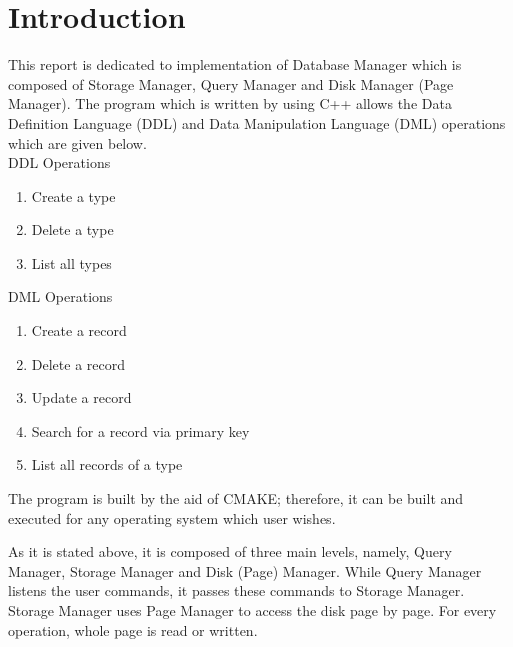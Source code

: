 \documentclass[12pt]{article}
\begin{document}
\begin{titlepage}

 


\end{titlepage}

\section{Introduction}

This report is dedicated to implementation of Database Manager which is composed of Storage Manager, Query Manager and Disk Manager (Page Manager). The program which is written by using C++ allows the Data Definition Language (DDL) and Data Manipulation Language (DML) operations which are given below. \\

DDL Operations\\

\begin{enumerate}
\item Create a type
\item Delete a type
\item List all types
\end{enumerate}

DML Operations\\

\begin{enumerate}
\item Create a record
\item Delete a record
\item Update a record
\item Search for a record via primary key
\item List all records of a type     
\end{enumerate}

The program is built by the aid of CMAKE; therefore, it can be built and executed for any operating system which user wishes.

As it is stated above, it is composed of three main levels, namely, Query Manager, Storage Manager and Disk (Page) Manager. While Query Manager listens the user commands, it passes these commands to Storage Manager. Storage Manager uses Page Manager to access the disk page by page. For every operation, whole page is read or written. 
\end{document}

